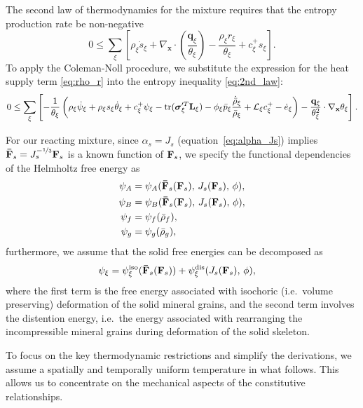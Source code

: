 The second law of thermodynamics for the mixture requires that the entropy production rate be non-negative
\begin{equation}
  0 \leq \sum_{\xi} \left[ \rho_{\xi} \dot{s}_{\xi} + \nabla_{\mathbf{x}} \cdot \left( \frac{\mathbf{q}_{\xi}}{\theta_{\xi}} \right) - \frac{\rho_{\xi} r_{\xi}}{\theta_{\xi}} + c_{\xi}^{+} s_{\xi} \right].
  \label{eq:2nd_law}
\end{equation}
To apply the Coleman-Noll procedure, we substitute the expression for the heat supply term \eqref{eq:rho_r} into the entropy inequality \eqref{eq:2nd_law}:
\begin{equation}
  0 \leq \sum_{\xi} \left[ - \frac{1}{\theta_{\xi}} \left( \rho_{\xi} \dot{\psi}_{\xi} +  \rho_\xi s_\xi \dot\theta_\xi + c_{\xi}^{+} \psi_{\xi}  - \mathrm{tr}(\boldsymbol{\sigma}^{\prime T}_{\xi} \mathbf{L}_{\xi}) - \phi_{\xi} \bar{p}_\xi \frac{\dot{\bar\rho}_{\xi}}{\bar\rho_{\xi}} + \mathcal{L}_{\xi} c_{\xi}^{+} - \dot{e}_{\xi}\right) - \frac{\mathbf{q}_\xi}{\theta^2_{\xi}} \cdot \nabla_{\mathbf{x}} \theta_\xi \right].
  \label{eq:2nd_law_expand_1}
\end{equation}

For our reacting mixture, since $\alpha_s = J_s$ (equation~\eqref{eq:alpha_Js}) implies $\mathbf{\bar F}_s = J_s^{-\nicefrac{1}{3}} \mathbf{F}_s$ is a known function of $\mathbf{F}_s$, we specify the functional dependencies of the Helmholtz free energy as
\begin{align*}
  \psi_A &= \psi_A(\mathbf{\bar F}_s(\mathbf{F}_s),\, J_s(\mathbf{F}_s),\, \phi), \\
  \psi_B &= \psi_B(\mathbf{\bar F}_s(\mathbf{F}_s),\, J_s(\mathbf{F}_s),\, \phi), \\
  \psi_f &= \psi_f(\bar\rho_f), \\
  \psi_g &= \psi_g(\bar\rho_g),
\end{align*}
furthermore, we assume that the solid free energies can be decomposed as
\begin{align*}
  \psi_\xi &= \psi_\xi^{\text{iso}}(\mathbf{\bar F}_s(\mathbf{F}_s)) + \psi_\xi^{\text{dis}}(J_s(\mathbf{F}_s),\, \phi),
\end{align*}
where the first term is the free energy associated with isochoric (i.e.\ volume preserving) deformation of the solid mineral grains, and the second term involves the distention energy, i.e.\ the energy associated with rearranging the incompressible mineral grains during deformation of the solid skeleton.

To focus on the key thermodynamic restrictions and simplify the derivations, we assume a spatially and temporally uniform temperature in what follows.  This allows us to concentrate on the mechanical aspects of the constitutive relationships.

